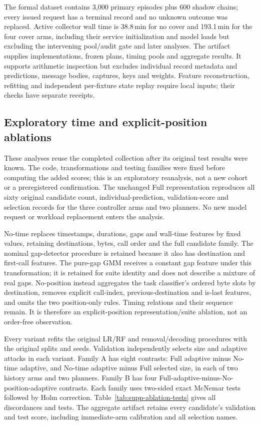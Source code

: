 The formal dataset contains 3,000 primary episodes plus 600 shadow chains; every issued request has a terminal record and no unknown outcome was replaced. Active collector wall time is 38.8\,min for no cover and 193.1\,min for the four cover arms, including their service initialization and model loads but excluding the intervening pool/audit gate and later analyses. The artifact supplies implementations, frozen plans, timing pools and aggregate results. It supports arithmetic inspection but excludes individual record metadata and predictions, message bodies, captures, keys and weights. Feature reconstruction, refitting and independent per-fixture state replay require local inputs; their checks have separate receipts.



\subsection{Exploratory time and explicit-position ablations}\label{supp:feature-ablation}
These analyses reuse the completed collection after its original test results were known. The code, transformations and testing families were fixed before computing the added scores; this is an exploratory reanalysis, not a new cohort or a preregistered confirmation. The unchanged Full representation reproduces all sixty original candidate count, individual-prediction, validation-score and selection records for the three controller arms and two planners. No new model request or workload replacement enters the analysis.

No-time replaces timestamps, durations, gaps and wall-time features by fixed values, retaining destinations, bytes, call order and the full candidate family. The nominal gap-detector procedure is retained because it also has destination and first-call features. The pure-gap GMM receives a constant gap feature under this transformation; it is retained for suite identity and does not describe a mixture of real gaps. No-position instead aggregates the task classifier's ordered byte slots by destination, removes explicit call-index, previous-destination and is-last features, and omits the two position-only rules. Timing relations and their sequence remain. It is therefore an explicit-position representation/suite ablation, not an order-free observation.

Every variant refits the original LR/RF and removal/decoding procedures with the original splits and seeds. Validation independently selects size and adaptive attacks in each variant. Family A has eight contrasts: Full adaptive minus No-time adaptive, and No-time adaptive minus Full selected size, in each of two history arms and two planners. Family B has four Full-adaptive-minus-No-position-adaptive contrasts. Each family uses two-sided exact McNemar tests followed by Holm correction. Table~\ref{tab:supp-ablation-tests} gives all discordances and tests. The aggregate artifact retains every candidate's validation and test score, including immediate-arm calibration and all selection names.

